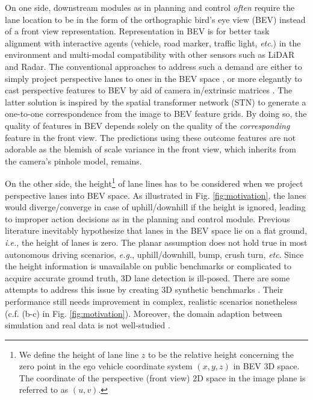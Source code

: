 \documentclass[runningheads]{llncs}
\begin{document}
On one side, 
downstream modules as in planning and control \textit{often} require the lane location to be in the form of the orthographic bird's eye view (BEV) instead of a front view representation.
Representation in BEV is for better task alignment with interactive agents (vehicle, road marker, traffic light, \textit{etc}.)  in the environment and multi-modal compatibility with other sensors such as LiDAR and Radar.
The conventional approaches to address such a demand are
either to simply project perspective lanes to ones in the BEV space \cite{wang2014approach,meyer2018deep}, or more elegantly to 
 cast perspective features to BEV by aid of camera in/extrinsic matrices \cite{Garnett_2019_ICCV,guo2020gen,yu2020detecting}. 
The latter solution is inspired by the spatial transformer network (STN) \cite{jaderberg2015spatial} to generate a one-to-one correspondence from the image to BEV feature grids.
By doing so, 
the quality of features in BEV
depends solely on the quality of the \textit{corresponding} feature in the front view.
The predictions using these outcome features are not adorable as
the blemish of scale variance in the front view, which inherits from the camera's pinhole model, remains.


On the other side, the height\footnote{We define the height of lane line $z$ to be the relative height concerning the zero point in the ego vehicle coordinate system $(x,y,z)$ in BEV 3D space. The coordinate of the perspective (front view) 2D space in the image plane is referred to as $(u,v)$.} of lane lines has to be considered when we project perspective lanes into BEV space. As illustrated in Fig. \ref{fig:motivation}, the lanes would diverge/converge in case of uphill/downhill if the height is ignored, leading to improper action decisions as in the planning and control module.
Previous literature \cite{wang2014approach,neven2018towards,su2021structure} inevitably 
hypothesize that lanes in the BEV space lie on a flat ground, \textit{i.e.},  the height of lanes is zero.
The planar assumption does not hold true in most autonomous driving scenarios, \textit{e.g.}, uphill/downhill, bump, crush turn, \textit{etc}. 
{Since the height information is unavailable on public benchmarks or complicated to acquire accurate ground truth,}
3D lane detection is ill-posed.
There are some attempts to address this issue by creating 3D synthetic benchmarks \cite{Garnett_2019_ICCV,guo2020gen}.
Their performance still needs improvement in complex, realistic scenarios {nonetheless (c.f. (b-c) in Fig. \ref{fig:motivation})}. 
Moreover, 
the domain adaption between simulation and real data is not well-studied \cite{garnett2020synthetic}.
\end{document}
